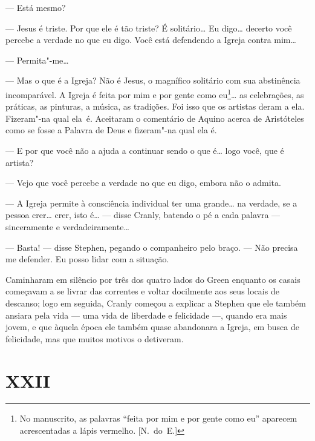 --- Está mesmo?

--- Jesus é triste.  Por que ele é tão triste?  É solitário\ldots{}  Eu digo\ldots{}
decerto você percebe a verdade no que eu digo.  Você está defendendo a Igreja
contra mim\ldots{}

--- Permita"-me\ldots{}

--- Mas o que é a Igreja?  Não é Jesus, o magnífico solitário com sua
abstinência incomparável.  A Igreja é feita por mim e por gente como
eu\footnote{ No manuscrito, as palavras “feita por mim e por gente como eu”
aparecem acrescentadas a lápis vermelho. [N.~do~E.]}\ldots{} as celebrações, as
práticas, as pinturas, a música, as tradições.  Foi isso que os artistas deram
a ela.  Fizeram"-na qual \mbox{ela é}.  Aceitaram o comentário de Aquino acerca de
Aristóteles como se fosse a Palavra de Deus e fizeram"-na qual ela é.

--- E por que você não a ajuda a continuar sendo o que é\ldots{} logo você, que é
artista?

--- Vejo que você percebe a verdade no que eu digo, embora não o admita.

--- A Igreja permite à consciência individual ter uma grande\ldots{} na verdade, se a pessoa
crer\ldots{} crer, isto é\ldots{} --- disse Cranly, batendo o pé a cada palavra ---
sinceramente e verdadeiramente\ldots{}

--- Basta! --- disse Stephen, pegando o companheiro pelo braço.  --- Não
precisa me defender.  Eu posso lidar com a situação.

Caminharam em silêncio por três dos quatro lados do Green enquanto os casais
começavam a se livrar das correntes e voltar docilmente aos seus locais de		
descanso; logo em seguida, Cranly começou a explicar a Stephen que ele também		
ansiara pela vida --- uma vida de liberdade e felicidade ---, quando era mais
jovem, e que àquela época ele também quase abandonara a Igreja, em busca de
felicidade, mas que muitos motivos o detiveram.


\section*{XXII}

